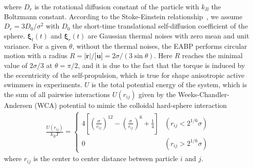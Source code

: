 \documentclass[prl, twocolumn, showpacs, preprintnumbers,amsmath,amssymb]{revtex4-1}
\begin{document}
where $D_r$ is the rotational diffusion constant of the particle with $k_B$ the Boltzmann constant.  According to the Stoke-Einstein relationship~\cite{ni2013natcom}, we assume $D_r=3 D_0/\sigma^2$ with $D_0$ the short-time translational self-diffusion coefficient of the sphere.
${\bm \xi}_t(t)$ and ${\bm \xi}_r(t)$ are Gaussian thermal noises with zero mean and unit variance. 
For a given $\theta$, without the thermal noises, the EABP performs circular motion with a radius $R=|\dot{\textbf{r}}|/|\dot{\textbf{u}}| = 2\sigma/(3\sin \theta)$. Here $R$ reaches the minimal value of $2\sigma/3$ at $\theta = \pi/2$, and it is due to the fact that the torque is induced by the eccentricity of the self-propulsion, which is true for shape anisotropic active swimmers in experiments.
$U$ is the total potential energy of the system, which is the sum of all pairwise interactions $U(r_{ij})$ given by the Weeks-Chandler-Andersen (WCA) potential to mimic the colloidal hard-sphere interaction~\cite{wca}
\begin{eqnarray}
\frac{U(r_{ij})}{k_BT}=\left\{
\begin{array}{lr}
4\left[\left(\frac{\sigma}{r_{ij}}\right)^{12}-\left(\frac{\sigma}{r_{ij}}\right)^{6}+\frac{1}{4}\right] & (r_{ij}<2^{1/6}\sigma)\\
0& (r_{ij}>2^{1/6}\sigma)
\end{array}
\right.
\end{eqnarray}
where $r_{ij}$ is the center to center distance between particle $i$ and $j$.




\begin{figure*}
\centering
\caption{\label{fig2} {\bf Phase behavior of the 2D passive-EABP mixtures with various eccentricity.} Typical snapshots (upper panels) and the reduced probability distribution of local density $P(\rho_a,\rho_p)/P_{\max}$  (lower panels) in the binary mixture of passive particles (red) and EABPs (blue) at $\rho \sigma ^ 2 = 0.891$, $x_p=0.4$, and $f\sigma/k_B T =200$ with various eccentricity: (a) $\theta=0\ ({\rm R}= +\infty)$; (b) $\theta=14.5^{\circ}\  ({\rm R}= 8/3\sigma)$; (c) $\theta=30^{\circ}\  ({\rm R}= 4/3\sigma)$; (d) $\theta=90^{\circ}\  ({\rm R}= 2/3\sigma)$. Here $\rho_a$ and $\rho_p$ are the local density of EABPs and passive particles, respectively, with $P_{\max}$ the maximal probability in $P(\rho_a,\rho_p)$. Movies of the systems can be found in Supplementary S1. The arrows indicate the direction of rotation of the passive particle cluster.}
\end{figure*}
\end{document}
